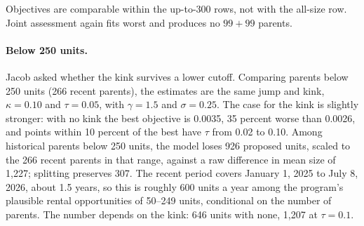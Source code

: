 Objectives are comparable within the up-to-300 rows, not with the all-size
row. Joint assessment again fits worst and produces no $99+99$ parents.

\paragraph{Below 250 units.} Jacob asked whether the kink survives a lower
cutoff. Comparing parents below 250 units (266 recent parents), the estimates
are the same jump and kink, $\kappa=0.10$ and $\tau=0.05$, with $\gamma=1.5$ and
$\sigma=0.25$. The case for the kink is slightly stronger: with no kink the best
objective is 0.0035, 35 percent worse than 0.0026, and points within 10 percent
of the best have $\tau$ from 0.02 to 0.10. Among historical parents below 250
units, the model loses 926 proposed units, scaled to the 266 recent parents in
that range, against a raw difference in mean size of 1,227; splitting preserves
307. The recent period covers January 1, 2025 to July 8, 2026, about 1.5 years,
so this is roughly 600 units a year among the program's plausible rental
opportunities of 50--249 units, conditional on the number of parents. The
number depends on the kink: 646 units with none, 1,207 at $\tau=0.1$.
